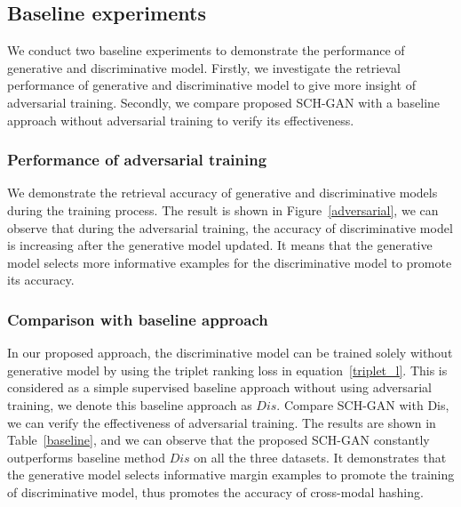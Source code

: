 \documentclass[journal]{IEEEtran}
\begin{document}
\subsection{Baseline experiments}
We conduct two baseline experiments to demonstrate the performance of generative and discriminative model. Firstly, we investigate the retrieval performance of generative and discriminative model to give more insight of adversarial training. Secondly, we compare proposed SCH-GAN with a baseline approach without adversarial training to verify its effectiveness.
\subsubsection{Performance of adversarial training} We demonstrate the retrieval accuracy of generative and discriminative models during the training process. The result is shown in Figure~\ref{adversarial}, we can observe that during the adversarial training, the accuracy of discriminative model is increasing after the generative model updated. It means that the generative model selects more informative examples for the discriminative model to promote its accuracy.
\subsubsection{Comparison with baseline approach} In our proposed approach, the discriminative model can be trained solely without generative model by using the triplet ranking loss in equation~\ref{triplet_l}. This is considered as a simple supervised baseline approach without using adversarial training, we denote this baseline approach as $Dis$. Compare SCH-GAN with Dis, we can verify the effectiveness of adversarial training. The results are shown in Table~\ref{baseline}, and we can observe that the proposed SCH-GAN constantly outperforms baseline method $Dis$ on all the three datasets. It demonstrates that the generative model selects informative margin examples to promote the training of discriminative model, thus promotes the accuracy of cross-modal hashing.
\end{document}
